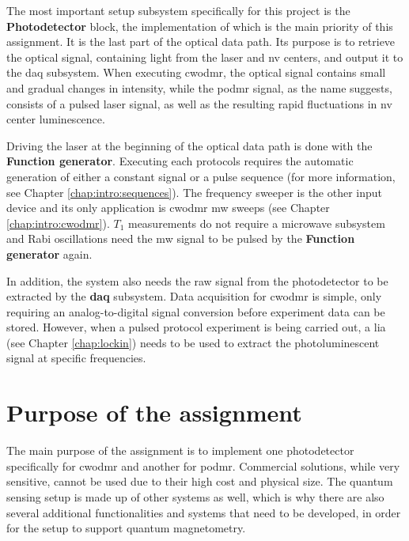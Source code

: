 The most important setup subsystem specifically for this project is the \textbf{Photodetector} block, the implementation of which is the main priority of this assignment. It is the last part of the optical data path. Its purpose is to retrieve the optical signal, containing light from the laser and \gls{nv} centers, and output it to the \gls{daq} subsystem. When executing \gls{cwodmr}, the optical signal contains small and gradual changes in intensity, while the \gls{podmr} signal, as the name suggests, consists of a pulsed laser signal, as well as the resulting rapid fluctuations in \gls{nv} center luminescence.

Driving the laser at the beginning of the optical data path is done with the \textbf{Function generator}. Executing each protocols requires the automatic generation of either a constant signal or a pulse sequence (for more information, see Chapter \ref{chap:intro:sequences}). The frequency sweeper is the other input device and its only application is \gls{cwodmr} \gls{mw} sweeps (see Chapter \ref{chap:intro:cwodmr}). $T_1$ measurements do not require a microwave subsystem and Rabi oscillations need the \gls{mw} signal to be pulsed by the \textbf{Function generator} again.

In addition, the system also needs the raw signal from the photodetector to be extracted by the \textbf{\gls{daq}} subsystem. Data acquisition for \gls{cwodmr} is simple, only requiring an analog-to-digital signal conversion before experiment data can be stored. However, when a pulsed protocol experiment is being carried out, a \gls{lia} (see Chapter \ref{chap:lockin}) needs to be used to extract the photoluminescent signal at specific frequencies.



\section{Purpose of the assignment}\label{purpose}
The main purpose of the assignment is to implement one photodetector specifically for \gls{cwodmr} and another for \gls{podmr}. Commercial solutions, while very sensitive, cannot be used due to their high cost and physical size. The quantum sensing setup is made up of other systems as well, which is why there are also several additional functionalities and systems that need to be developed, in order for the setup to support quantum magnetometry.



